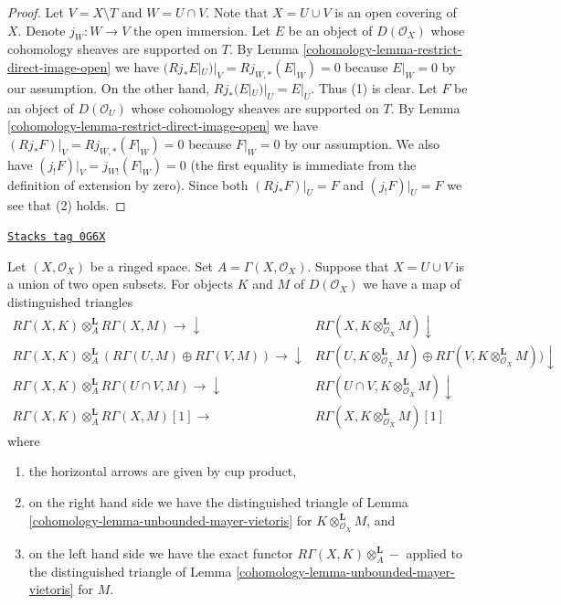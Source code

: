 \begin{proof}

Let $V = X \setminus T$ and $W = U \cap V$. Note that $X = U \cup V$ is an
open covering of $X$. Denote $j_W : W \to V$ the open immersion.
Let $E$ be an object of $D(\mathcal{O}_X)$ whose cohomology sheaves are
supported on $T$. By
Lemma \ref{cohomology-lemma-restrict-direct-image-open} we have
$(Rj_*E|_U)|_V = Rj_{W, *}(E|_W) = 0$ because $E|_W = 0$ by our assumption.
On the other hand, $Rj_*(E|_U)|_U = E|_U$. Thus (1) is clear.
Let $F$ be an object of $D(\mathcal{O}_U)$ whose cohomology sheaves
are supported on $T$. By
Lemma \ref{cohomology-lemma-restrict-direct-image-open} we have
$(Rj_*F)|_V = Rj_{W, *}(F|_W) = 0$ because $F|_W = 0$ by our assumption.
We also have $(j_!F)|_V = j_{W!}(F|_W) = 0$ (the first equality is immediate
from the definition of extension by zero). Since both
$(Rj_*F)|_U = F$ and $(j_!F)|_U = F$ we see that (2) holds.
\end{proof}

\begin{lemma}
\label{cohomology-lemma-mayer-vietoris-cup}
\href{https://stacks.math.columbia.edu/tag/0G6X}{\texttt{Stacks tag 0G6X}}

Let $(X, \mathcal{O}_X)$ be a ringed space. Set $A = \Gamma(X, \mathcal{O}_X)$.
Suppose that $X = U \cup V$ is a union of two open subsets. For objects
$K$ and $M$ of $D(\mathcal{O}_X)$ we have a map of distinguished triangles
$$
\begin{array}{cc}R\Gamma(X, K) \otimes_A^\mathbf{L} R\Gamma(X, M) \longrightarrow\downarrow & R\Gamma(X, K \otimes_{\mathcal{O}_X}^\mathbf{L} M) \downarrow \\ R\Gamma(X, K) \otimes_A^\mathbf{L}
(R\Gamma(U, M) \oplus R\Gamma(V, M)) \longrightarrow\downarrow & R\Gamma(U, K \otimes_{\mathcal{O}_X}^\mathbf{L} M)
\oplus R\Gamma(V, K \otimes_{\mathcal{O}_X}^\mathbf{L} M)) \downarrow \\ R\Gamma(X, K) \otimes_A^\mathbf{L} R\Gamma(U \cap V, M) \longrightarrow\downarrow & R\Gamma(U \cap V, K \otimes_{\mathcal{O}_X}^\mathbf{L} M) \downarrow \\ R\Gamma(X, K) \otimes_A^\mathbf{L} R\Gamma(X, M)[1] \longrightarrow & R\Gamma(X, K \otimes_{\mathcal{O}_X}^\mathbf{L} M)[1]\end{array}
$$
where
\begin{enumerate}
\item the horizontal arrows are given by cup product,
\item on the right hand side we have the distinguished triangle
of Lemma \ref{cohomology-lemma-unbounded-mayer-vietoris} for
$K \otimes_{\mathcal{O}_X}^\mathbf{L} M$, and
\item on the left hand side we have the exact functor
$R\Gamma(X, K) \otimes_A^\mathbf{L} - $ applied to the
distinguished triangle of Lemma \ref{cohomology-lemma-unbounded-mayer-vietoris} for $M$.
\end{enumerate}
\end{lemma}

